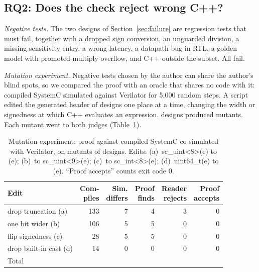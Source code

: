 \documentclass[conference]{IEEEtran}
\newcommand{\code}[1]{{\fontshape{n}\ttfamily #1}}
\begin{document}
\subsection{RQ2: Does the check reject wrong C++?}
\label{sec:mutation}

\emph{Negative tests.} The two designs of Section~\ref{sec:failure} are regression tests that must
fail, together with a dropped sign conversion, an unguarded division, a missing sensitivity entry,
a wrong latency, a datapath bug in RTL, a golden model with promoted-multiply overflow, and C++
outside the subset. All fail.

\emph{Mutation experiment.} Negative tests chosen by the author can share the author's blind
spots, so we compared the proof with an oracle that shares no code with it: compiled SystemC
simulated against Verilator for 5,000 random steps. A script edited the generated header of
\nMutDesignsGiven{} designs one place at a time, changing the width or signedness at which C++
evaluates an expression. \nMutDesigns{} designs produced mutants. Each mutant went to both judges
(Table~\ref{tab:mut}).

\begin{table}[t]
\centering
\caption{Mutation experiment: proof against compiled SystemC co-simulated with Verilator, on mutants of \nMutDesigns{} designs. Edits: (a)~\code{sc\_uint<8>(e)} to \code{(e)}; (b)~to \code{sc\_uint<9>(e)}; (c)~to \code{sc\_int<8>(e)}; (d)~\code{uint64\_t(e)} to \code{(e)}. ``Proof accepts'' counts exit code 0.}
\label{tab:mut}
\footnotesize
\setlength{\tabcolsep}{2.5pt}
\begin{tabular}{@{}l r r r r r@{}}
\toprule
Edit & \shortstack{Com-\\piles} & \shortstack{Sim.\\differs} & \shortstack{Proof\\finds} & \shortstack{Reader\\rejects} & \shortstack{Proof\\accepts} \\
\midrule
drop truncation (a) & 133 & 7 & 4 & 3 & 0 \\
one bit wider (b) & 106 & 5 & 5 & 0 & 0 \\
flip signedness (c) & 28 & 5 & 5 & 0 & 0 \\
drop built-in cast (d) & 14 & 0 & 0 & 0 & 0 \\
\midrule
Total & \nMutCompiled{} & \nMutSimDiffers{} & \nMutProofFinds{} & \nMutReaderRejects{} & \textbf{\nMutAccepted{}} \\
\bottomrule
\end{tabular}
\end{table}
\end{document}
